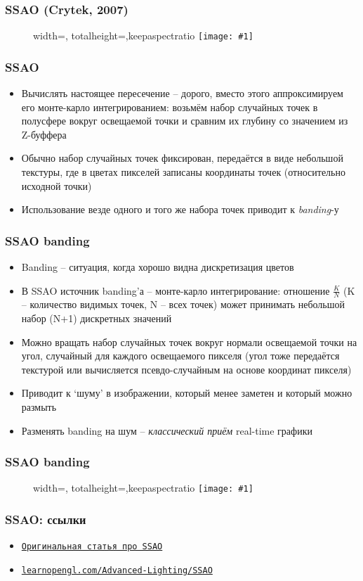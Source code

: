 \documentclass{beamer}
\newcommand{\slideimage}[1]{
  \begin{figure}
    \begin{adjustbox}{width=\textwidth, totalheight=\textheight-2\baselineskip-2\baselineskip,keepaspectratio}
      \texttt{[image: \#1]}
    \end{adjustbox}
  \end{figure}
}
\begin{document}
\begin{frame}[fragile]
\frametitle{SSAO (Crytek, 2007)}
\slideimage{crysis-ao.jpg}
\end{frame}

\begin{frame}[fragile]
\frametitle{SSAO}
\begin{itemize}
\item Вычислять настоящее пересечение -- дорого, вместо этого аппроксимируем его монте-карло интегрированием: возьмём набор случайных точек в полусфере вокруг освещаемой точки и сравним их глубину со значением из Z-буффера
\pause
\item Обычно набор случайных точек фиксирован, передаётся в виде небольшой текстуры, где в цветах пикселей записаны координаты точек (относительно исходной точки)
\pause
\item Использование везде одного и того же набора точек приводит к \textit{banding}-у
\end{itemize}
\end{frame}

\begin{frame}[fragile]
\frametitle{SSAO banding}
\begin{itemize}
\item Banding -- ситуация, когда хорошо видна дискретизация цветов
\pause
\item В SSAO источник banding'а -- монте-карло интегрирование: отношение \begin{math}\frac{K}{N}\end{math} (K -- количество видимых точек, N -- всех точек) может принимать небольшой набор (N+1) дискретных значений
\pause
\item Можно вращать набор случайных точек вокруг нормали освещаемой точки на угол, случайный для каждого освещаемого пикселя (угол тоже передаётся текстурой или вычисляется псевдо-случайным на основе координат пикселя)
\pause
\item Приводит к `шуму' в изображении, который менее заметен и который можно размыть
\pause
\item Разменять banding на шум -- \textit{классический приём} real-time графики
\end{itemize}
\end{frame}

\begin{frame}[fragile]
\frametitle{SSAO banding}
\slideimage{ssao.jpg}
\end{frame}

\begin{frame}[fragile]
\frametitle{SSAO: ссылки}
\begin{itemize}
\item \href{https://artis.inrialpes.fr/Membres/Olivier.Hoel/ssao/nVidiaHSAO/ScreenSpaceAO.pdf}{\texttt{Оригинальная статья про SSAO}}
\item \href{https://learnopengl.com/Advanced-Lighting/SSAO}{\texttt{learnopengl.com/Advanced-Lighting/SSAO}}
\end{itemize}
\end{frame}
\end{document}
